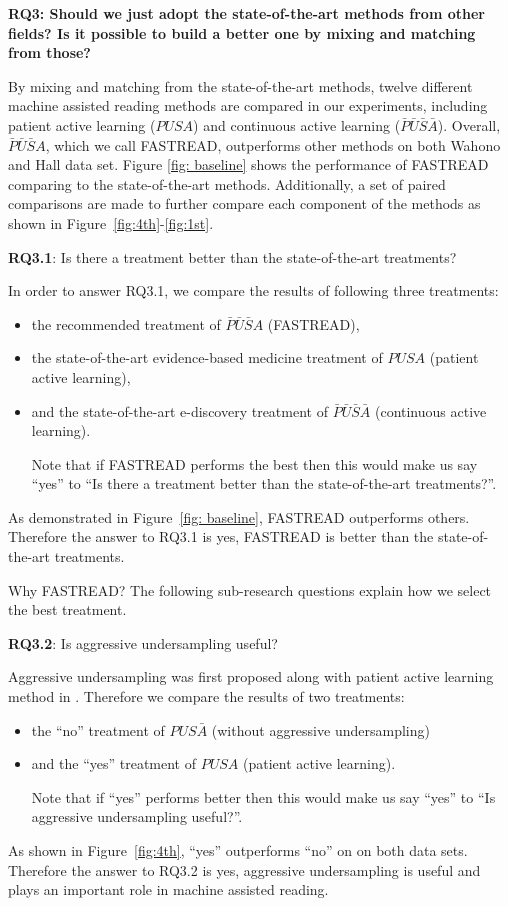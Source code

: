 \documentclass[final,twocolumn,5p]{elsarticle}
\theoremstyle{break}
\begin{document}
{\bf RQ3: Should we just adopt the state-of-the-art methods from other fields? Is it possible to build a better one by mixing and matching from those?}



By mixing and matching from the state-of-the-art methods, twelve different machine assisted reading methods are compared in our experiments, including patient active learning ($PUSA$) and continuous active learning ($\bar{P}\bar{U}\bar{S}\bar{A}$). Overall, $\bar{P}\bar{U}\bar{S}A$, which we call FASTREAD, outperforms other methods on both Wahono and Hall data set. Figure \ref{fig: baseline} shows the performance of FASTREAD comparing to the state-of-the-art methods. Additionally, a set of paired comparisons are made to further compare each component of the methods as shown in Figure~\ref{fig:4th}-\ref{fig:1st}.


\textbf{RQ3.1}: Is there a treatment better than the state-of-the-art treatments?

In order to answer RQ3.1, we compare the results of following three treatments:

\begin{itemize}
\item the recommended treatment of $\bar{P}\bar{U}\bar{S}A$ (FASTREAD),
\item the state-of-the-art evidence-based medicine treatment of $PUSA$ (patient active learning),
\item and the state-of-the-art e-discovery treatment of $\bar{P}\bar{U}\bar{S}\bar{A}$ (continuous active learning). 

Note that if FASTREAD performs the best then this would make us say ``yes'' to ``Is there a treatment better than the state-of-the-art treatments?''.
\end{itemize}

As demonstrated in Figure~\ref{fig: baseline}, FASTREAD outperforms others. Therefore the answer to RQ3.1 is yes, FASTREAD is better than the state-of-the-art treatments. 

Why FASTREAD? The following sub-research questions explain how we select the best treatment.

\textbf{RQ3.2}: Is aggressive undersampling useful?

Aggressive undersampling was first proposed along with patient active learning method in \cite{wallace2010semi}. Therefore we compare the results of two treatments:
\begin{itemize}
\item the ``no'' treatment of $PUS\bar{A}$ (without aggressive undersampling)
\item and the ``yes'' treatment of $PUSA$ (patient active learning). 

Note that if ``yes''
performs better then this would make us say ``yes'' to ``Is aggressive undersampling useful?''.
\end{itemize}
As shown in Figure~\ref{fig:4th}, ``yes'' outperforms ``no'' on on both data sets. Therefore the answer to RQ3.2 is yes, aggressive undersampling is useful and plays an important role in machine assisted reading.
\end{document}
